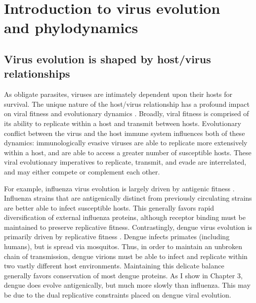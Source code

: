 %
%

%

\textpages
\chapter{Introduction to virus evolution\\and phylodynamics}
\section{Virus evolution is shaped by host/virus relationships}
As obligate parasites, viruses are intimately dependent upon their hosts for survival.
The unique nature of the host/virus relationship has a profound impact on viral fitness and evolutionary dynamics \citep{holmes2009evolution}.
Broadly, viral fitness is comprised of its ability to replicate within a host and transmit between hosts.
Evolutionary conflict between the virus and the host immune system influences both of these dynamics: immunologically evasive viruses are able to replicate more extensively within a host, and are able to access a greater number of susceptible hosts.
These viral evolutionary imperatives to replicate, transmit, and evade are interrelated, and may either compete or complement each other.

For example, influenza virus evolution is largely driven by antigenic fitness \citep{bush1999predicting}.
Influenza strains that are antigenically distinct from previously circulating strains are better able to infect susceptible hosts.
This generally favors rapid diversification of external influenza proteins, although receptor binding must be maintained to preserve replicative fitness.
Contrastingly, dengue virus evolution is primarily driven by replicative fitness \citep{grubaugh2016genetic}.
Dengue infects primates (including humans), but is spread via mosquitos.
Thus, in order to maintain an unbroken chain of transmission, dengue virions must be able to infect and replicate within two vastly different host environments.
Maintaining this delicate balance generally favors conservation of most dengue proteins.
As I show in Chapter 3, dengue does evolve antigenically, but much more slowly than influenza.
This may be due to the dual replicative constraints placed on dengue viral evolution.

